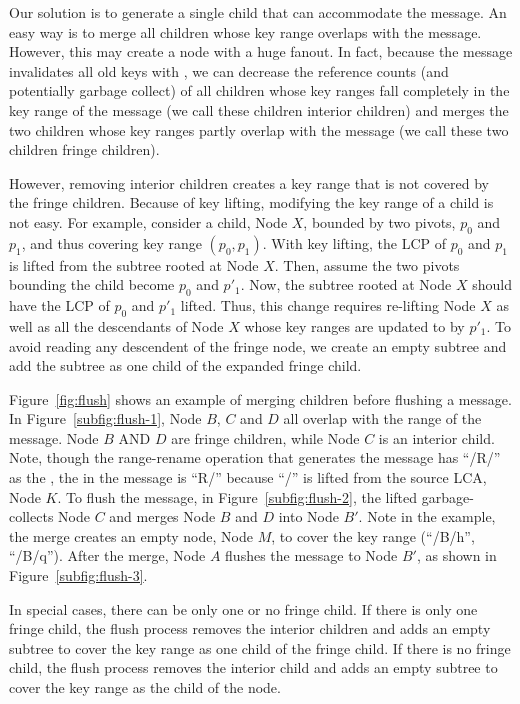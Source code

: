 Our solution is to generate a single child that can accommodate the \goto
message.
An easy way is to merge all children whose key range overlaps with the
\goto message.
However, this may create a node with a huge fanout.
In fact, because the \goto message invalidates all old keys
with \dpre, we can decrease the reference counts
(and potentially garbage collect)
of all children whose key ranges fall completely in the key range of the \goto
message (we call these children interior children)
and merges the two children whose key ranges partly overlap with the
\goto message (we call these two children fringe children).

However, removing interior children creates a key range that is not covered by
the fringe children.
Because of key lifting, modifying the key range of a child is not easy.
For example, consider a child, Node $X$, bounded by two pivots, $p_0$ and $p_1$,
and thus covering key range $(p_0, p_1)$.
With key lifting, the LCP of $p_0$ and $p_1$ is lifted from the subtree rooted
at Node $X$.
Then, assume the two pivots bounding the child become $p_0$ and $p'_1$.
Now, the subtree rooted at Node $X$ should have the LCP of $p_0$ and $p'_1$
lifted.
Thus, this change requires re-lifting Node $X$ as well as all the descendants
of Node $X$ whose key ranges are updated to by $p'_1$.
To avoid reading any descendent of the fringe node, we create an empty subtree
and add the subtree as one child of the expanded fringe child.

Figure~\ref{fig:flush} shows an example of merging children before flushing a
\goto message.
In Figure~\ref{subfig:flush-1}, Node $B$, $C$ and $D$ all overlap with the
range of the \goto message.
Node $B$ AND $D$ are fringe children, while Node $C$ is an interior child.
Note, though the range-rename operation that generates the \goto message has
``/R/'' as the \spre, the \spre in the \goto message is ``R/'' because ``/'' is
lifted from the source LCA, Node $K$.
To flush the \goto message, in Figure~\ref{subfig:flush-2}, the lifted \bedag
garbage-collects Node $C$ and merges Node $B$ and $D$ into Node $B'$.
Note in the example, the merge creates an empty node, Node $M$, to cover the key
range (``/B/h'', ``/B/q'').
After the merge, Node $A$ flushes the \goto message to Node $B'$, as shown in
Figure~\ref{subfig:flush-3}.

In special cases, there can be only one or no fringe child.
If there is only one fringe child, the flush process removes the interior
children and adds an empty subtree to cover the key range as one child of the
fringe child.
If there is no fringe child, the flush process removes the interior child and
adds an empty subtree to cover the key range as the child of the node.

